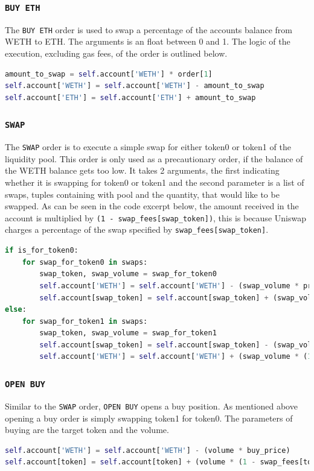 \subsubsection{\texttt{BUY\ ETH}}
The \texttt{BUY\ ETH} order is used to swap a percentage of the accounts balance from WETH to ETH. The arguments is an float between 0 and 1. The logic of the execution, excluding gas fees, of the order is outlined below.
\vspace{5mm}
\begin{lstlisting}[language=Python]
amount_to_swap = self.account['WETH'] * order[1]
self.account['WETH'] = self.account['WETH'] - amount_to_swap
self.account['ETH'] = self.account['ETH'] + amount_to_swap
\end{lstlisting}

\subsubsection{\texttt{SWAP}}
The \texttt{SWAP} order is to execute a simple swap for either token0 or token1 of the liquidity pool. This order is only used as a precautionary order, if the balance of the WETH balance gets too low. It takes 2 arguments, the first indicating whether it is swapping for token0 or token1 and the second parameter is a list of swaps, tuples containing with pool and the quantity, that would like to be swapped. As can be seen in the code excerpt below, the amount received in the account is multiplied by \texttt{(1 - swap\_fees[swap\_token])}, this is because Uniswap charges a percentage of the swap specified by \texttt{swap\_fees[swap\_token]}.
\vspace{5mm}
\begin{lstlisting}[language=Python]
if is_for_token0:
    for swap_for_token0 in swaps:
        swap_token, swap_volume = swap_for_token0
        self.account['WETH'] = self.account['WETH'] - (swap_volume * prices[f'P{swap_token[1]}'])
        self.account[swap_token] = self.account[swap_token] + (swap_volume * (1 - swap_fees[swap_token]))
else:
    for swap_for_token1 in swaps:
        swap_token, swap_volume = swap_for_token1
        self.account[swap_token] = self.account[swap_token] - (swap_volume / prices[f'P{swap_token[1]}'])
        self.account['WETH'] = self.account['WETH'] + (swap_volume * (1 - swap_fees[swap_token]))
\end{lstlisting}

\subsubsection{\texttt{OPEN\ BUY}}
Similar to the \texttt{SWAP} order, \texttt{OPEN\ BUY} opens a buy position. As mentioned above opening a buy order is simply swapping token1 for token0. The parameters of buying are the target token and the volume. 
\vspace{5mm}
\begin{lstlisting}[language=Python]
self.account['WETH'] = self.account['WETH'] - (volume * buy_price)
self.account[token] = self.account[token] + (volume * (1 - swap_fees[token]))
\end{lstlisting}

